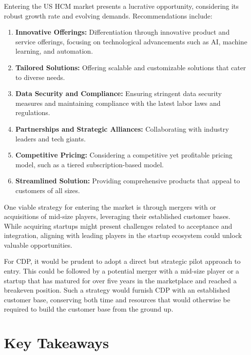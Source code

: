 \documentclass[
  a4paper,
]{book}
\providecommand{\tightlist}{%
  \setlength{\itemsep}{0pt}\setlength{\parskip}{0pt}}\usepackage{longtable,booktabs,array}
\renewcommand{\labelenumi}{\textbf{\textcolor{com-color}{\arabic*.}}}%
\begin{document}
Entering the US HCM market presents a lucrative opportunity, considering
its robust growth rate and evolving demands. Recommendations include:

\begin{enumerate}
\def\labelenumi{\arabic{enumi}.}
\tightlist
\item
  \textbf{Innovative Offerings:} Differentiation through innovative
  product and service offerings, focusing on technological advancements
  such as AI, machine learning, and automation.
\item
  \textbf{Tailored Solutions:} Offering scalable and customizable
  solutions that cater to diverse needs.
\item
  \textbf{Data Security and Compliance:} Ensuring stringent data
  security measures and maintaining compliance with the latest labor
  laws and regulations.
\item
  \textbf{Partnerships and Strategic Alliances:} Collaborating with
  industry leaders and tech giants.
\item
  \textbf{Competitive Pricing:} Considering a competitive yet profitable
  pricing model, such as a tiered subscription-based model.
\item
  \textbf{Streamlined Solution:} Providing comprehensive products that
  appeal to customers of all sizes.
\end{enumerate}

One viable strategy for entering the market is through mergers with or
acquisitions of mid-size players, leveraging their established customer
bases. While acquiring startups might present challenges related to
acceptance and integration, aligning with leading players in the startup
ecosystem could unlock valuable opportunities.

For CDP, it would be prudent to adopt a direct but strategic pilot
approach to entry. This could be followed by a potential merger with a
mid-size player or a startup that has matured for over five years in the
marketplace and reached a breakeven position. Such a strategy would
furnish CDP with an established customer base, conserving both time and
resources that would otherwise be required to build the customer base
from the ground up.

\hypertarget{key-takeaways}{%
\section{Key Takeaways}\label{key-takeaways}}
\end{document}
